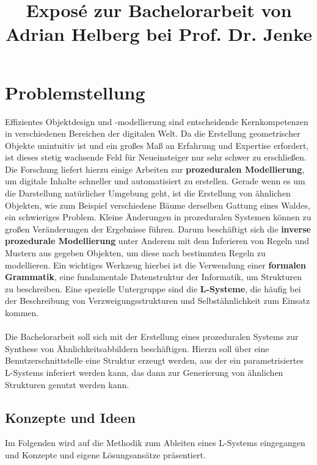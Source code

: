 \documentclass[11pt]{article}
\title{\textbf{Exposé} zur Bachelorarbeit von Adrian Helberg bei Prof. Dr. Jenke}
\begin{document}
    \maketitle

    \section{Problemstellung}

    Effizientes Objektdesign und -modellierung sind entscheidende Kernkompetenzen in verschiedenen Bereichen der
    digitalen Welt.
    Da die Erstellung geometrischer Objekte unintuitiv ist und ein großes Maß an Erfahrung und Expertise
    erfordert, ist dieses stetig wachsende Feld für Neueinsteiger nur sehr schwer zu erschließen.
    Die Forschung liefert hierzu einige Arbeiten zur \textbf{prozeduralen Modellierung}, um digitale Inhalte schneller
    und automatisiert zu erstellen.
    Gerade wenn es um die Darstellung natürlicher Umgebung geht, ist die Erstellung von ähnlichen Objekten, wie
    zum Beispiel verschiedene Bäume derselben Gattung eines Waldes, ein schwieriges Problem.
    Kleine Änderungen in prozeduralen Systemen können zu großen Veränderungen der Ergebnisse führen.
    Darum beschäftigt sich die \textbf{inverse prozedurale Modellierung} unter Anderem mit dem Inferieren von Regeln
    und Mustern aus gegeben Objekten, um diese nach bestimmten Regeln zu modellieren.
    Ein wichtiges Werkzeug hierbei ist die Verwendung einer \textbf{formalen Grammatik}, eine fundamentale Datenstruktur
    der Informatik, um Strukturen zu beschreiben.
    Eine spezielle Untergruppe sind die \textbf{L-Systeme}, die häufig bei der Beschreibung
    von Verzweigungsstrukturen und Selbstähnlichkeit zum Einsatz kommen.\\~\\
    Die Bachelorarbeit soll sich mit der Erstellung eines prozeduralen Systems zur Synthese von Ähnlichkeitsabbildern
    beschäftigen.
    Hierzu soll über eine Benutzerschnittstelle eine Struktur erzeugt werden, aus der ein parametrisiertes L-Systems
    inferiert werden kann, das dann zur Generierung von ähnlichen Strukturen genutzt werden kann.

    \subsection{Konzepte und Ideen}
    Im Folgenden wird auf die Methodik zum Ableiten eines L-Systems eingegangen und Konzepte und eigene Lösungsansätze
    präsentiert.
\end{document}

